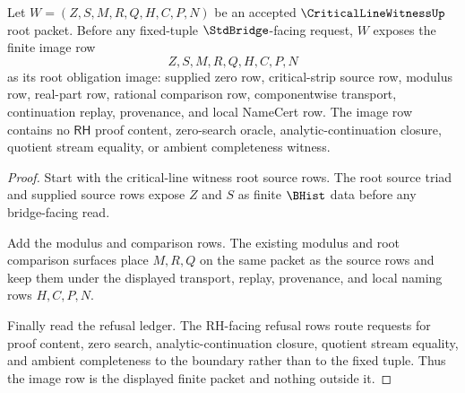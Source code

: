 \begin{theorem}
\label{thm:critical-line-witness-root-obligation-image-row}
Let $W=(Z,S,M,R,Q,H,C,P,N)$ be an accepted $\CriticalLineWitnessUp$ root packet. Before any fixed-tuple $\StdBridge$-facing request, $W$ exposes the finite image row
$$
Z,S,M,R,Q,H,C,P,N
$$
as its root obligation image: supplied zero row, critical-strip source row, modulus row, real-part row, rational comparison row, componentwise transport, continuation replay, provenance, and local NameCert row. The image row contains no $\mathsf{RH}$ proof content, zero-search oracle, analytic-continuation closure, quotient stream equality, or ambient completeness witness.
\end{theorem}
\begin{proof}
Start with the critical-line witness root source rows. The root source triad and supplied source rows expose $Z$ and $S$ as finite $\BHist$ data before any bridge-facing read.

Add the modulus and comparison rows. The existing modulus and root comparison surfaces place $M,R,Q$ on the same packet as the source rows and keep them under the displayed transport, replay, provenance, and local naming rows $H,C,P,N$.

Finally read the refusal ledger. The RH-facing refusal rows route requests for proof content, zero search, analytic-continuation closure, quotient stream equality, and ambient completeness to the boundary rather than to the fixed tuple. Thus the image row is the displayed finite packet and nothing outside it.
\end{proof}

